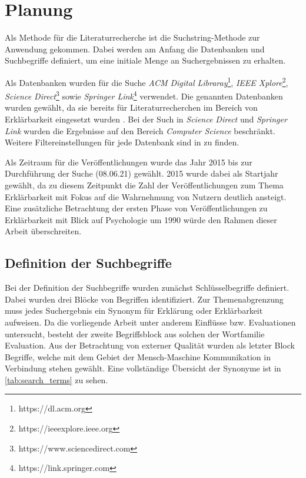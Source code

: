 \section{Planung}

Als Methode für die Literaturrecherche ist die Suchstring-Methode zur Anwendung gekommen. Dabei werden am Anfang die Datenbanken und Suchbegriffe definiert, um eine initiale Menge an Suchergebnissen zu erhalten.

Als Datenbanken wurden für die Suche \textit{ACM Digital Libraray}\footnote{https://dl.acm.org}, \textit{IEEE Xplore}\footnote{https://ieeexplore.ieee.org}, \textit{Science Direct}\footnote{https://www.sciencedirect.com} sowie \textit{Springer Link}\footnote{https://link.springer.com} verwendet. Die genannten Datenbanken wurden gewählt, da sie bereits für Literaturrecherchen im Bereich von Erklärbarkeit eingesetzt wurden \cite{nunes_systematic_2017, carvalho2017quality}. Bei der Such in \textit{Science Direct} und \textit{Springer Link} wurden die Ergebnisse auf den Bereich \textit{Computer Science} beschränkt. Weitere Filtereinstellungen für jede Datenbank sind in  zu finden.

Als Zeitraum für die Veröffentlichungen wurde das Jahr 2015 bis zur Durchführung der Suche (08.06.21) gewählt. 2015 wurde dabei als Startjahr gewählt, da zu diesem Zeitpunkt die Zahl der Veröffentlichungen zum Thema Erklärbarkeit mit Fokus auf die Wahrnehmung von Nutzern deutlich ansteigt. Eine zusätzliche Betrachtung der ersten Phase von Veröffentlichungen zu Erklärbarkeit mit Blick auf Psychologie um 1990 würde den Rahmen dieser Arbeit überschreiten.

\subsection{Definition der Suchbegriffe}

Bei der Definition der Suchbegriffe wurden zunächst Schlüsselbegriffe definiert. Dabei wurden drei Blöcke von Begriffen identifiziert. Zur Themenabgrenzung muss jedes Suchergebnis ein Synonym für \glqq Erklärung\grqq{} oder \glqq Erklärbarkeit\grqq{} aufweisen. Da die vorliegende Arbeit unter anderem Einflüsse bzw. Evaluationen untersucht, besteht der zweite Begriffsblock aus solchen der Wortfamilie \glqq Evaluation\grqq{}. Aus der Betrachtung von externer Qualität wurden als letzter Block Begriffe, welche mit dem Gebiet der Mensch-Maschine Kommunikation in Verbindung stehen gewählt. Eine vollständige Übersicht der Synonyme ist in \autoref{tab:search_terms} zu sehen.

